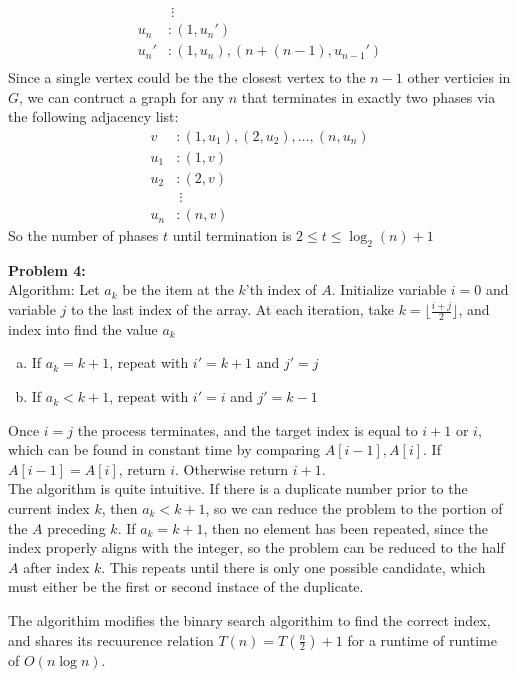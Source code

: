 \documentclass{article}
\begin{document}
\begin{enumerate}[a)]
\begin{align*}
        &\ \vdots \\
        u_n &: (1, u_n') \\
        u_n' &: (1, u_n), (n + (n - 1), u_{n - 1}') \\
    \end{align*}
    Since a single vertex could be the the closest vertex to the $n - 1$ other verticies in $G$, we can contruct a graph for any $n$ that terminates in exactly two phases via the following adjacency list:
    \begin{align*}
        v &: (1, u_1), (2, u_2), \dots , (n, u_n) \\
        u_1 &: (1, v) \\
        u_2 &: (2, v) \\
        &\ \vdots \\
        u_n &: (n, v) 
    \end{align*}
    So the number of phases $t$ until termination  is $2 \leq t \leq \log_2(n) + 1$
\end{enumerate}
\textbf{Problem 4:} \\[1.0ex]
Algorithm: Let $a_k$ be the item at the $k$'th index of $A$. Initialize variable $i = 0$ and variable $j$ to the last index of the array. At each iteration, take $k = \lfloor \frac{i + j}{2} \rfloor$, and index into find the value $a_k$
\begin{enumerate}[(a)]
    \item If $a_k = k + 1$, repeat with $i' = k + 1$ and $j' = j$
    \item If $a_k < k + 1$, repeat with $i' = i$ and $j' = k - 1$
\end{enumerate}
Once $i = j$ the process terminates, and the target index is equal to $i + 1$ or $i$, which can be found in constant time by comparing $A[i - 1], A[i]$. If $A[i - 1] = A[i]$, return $i$. Otherwise return $i + 1$. \\[0.5ex]
The algorithm is quite intuitive. If there is a duplicate number prior to the current index $k$, then $a_k < k + 1$, so we can reduce the problem to the portion of the $A$ preceding $k$. If $a_k = k + 1$, then no element has 
been repeated, since the index properly aligns with the integer, so the problem can be reduced to the half $A$ after index $k$. This repeats until there is only one possible candidate, which must either be the first or second instace of the duplicate.

The algorithim modifies the binary search algorithim to find the correct index, and shares its recuurence relation $T(n) = T(\frac{n}{2}) + 1$ for a runtime of runtime of $O(n \log n)$.
\end{document}
